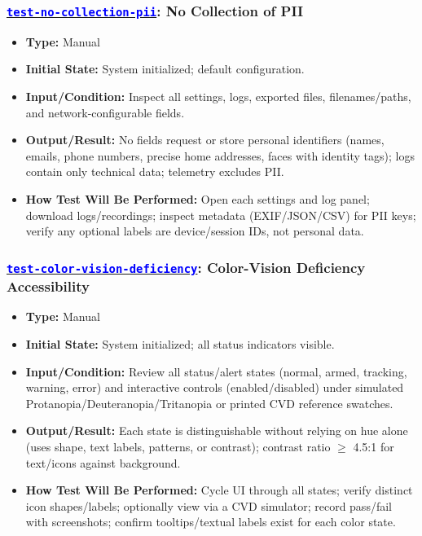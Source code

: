 \documentclass[12pt, titlepage]{article}
\newcommand{\tid}[1]{\hyperlink{tid:#1}{\textcolor{blue}{\texttt{#1}}}}
\begin{document}
\subsubsection*{\tid{test-no-collection-pii}: No Collection of PII}
\begin{itemize}
  \item \textbf{Type:} Manual
  \item \textbf{Initial State:} System initialized; default configuration.
  \item \textbf{Input/Condition:} Inspect all settings, logs, exported files, filenames/paths, and network-configurable fields.
  \item \textbf{Output/Result:} No fields request or store personal identifiers (names, emails, phone numbers, precise home addresses, faces with identity tags); logs contain only technical data; telemetry excludes PII.
  \item \textbf{How Test Will Be Performed:} Open each settings and log panel; download logs/recordings; inspect metadata (EXIF/JSON/CSV) for PII keys; verify any optional labels are device/session IDs, not personal data.
\end{itemize}

\subsubsection*{\tid{test-color-vision-deficiency}: Color-Vision Deficiency Accessibility}
\begin{itemize}
  \item \textbf{Type:} Manual
  \item \textbf{Initial State:} System initialized; all status indicators visible.
  \item \textbf{Input/Condition:} Review all status/alert states (normal, armed, tracking, warning, error) and interactive controls (enabled/disabled) under simulated Protanopia/Deuteranopia/Tritanopia or printed CVD reference swatches.
  \item \textbf{Output/Result:} Each state is distinguishable without relying on hue alone (uses shape, text labels, patterns, or contrast); contrast ratio \(\geq\) 4.5:1 for text/icons against background.
  \item \textbf{How Test Will Be Performed:} Cycle UI through all states; verify distinct icon shapes/labels; optionally view via a CVD simulator; record pass/fail with screenshots; confirm tooltips/textual labels exist for each color state.
\end{itemize}
\end{document}
